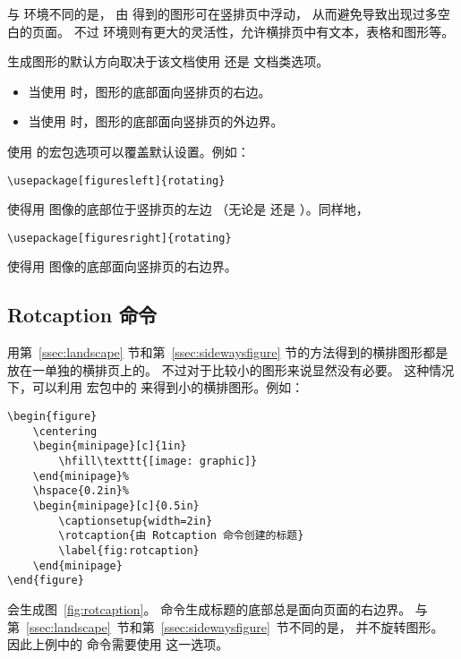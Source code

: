 与  环境不同的是，
由  得到的图形可在竖排页中浮动，
从而避免导致出现过多空白的页面。
不过  环境则有更大的灵活性，允许横排页中有文本，表格和图形等。

 生成图形的默认方向取决于该文档使用  还是  文档类选项。
\begin{itemize}
	\item 当使用  时，图形的底部面向竖排页的右边。
	\item 当使用  时，图形的底部面向竖排页的外边界。
\end{itemize}
使用  的宏包选项可以覆盖默认设置。例如：
\begin{lstlisting}
\usepackage[figuresleft]{rotating}
\end{lstlisting}
使得用  图像的底部位于竖排页的左边
（无论是  还是 ）。同样地，
\begin{lstlisting}
\usepackage[figuresright]{rotating}
\end{lstlisting}
使得用  图像的底部面向竖排页的右边界。

\subsection{Rotcaption 命令}

用第~\ref{ssec:landscape} 节和第~\ref{ssec:sidewaysfigure} 节的方法得到的横排图形都是放在一单独的横排页上的。
不过对于比较小的图形来说显然没有必要。
这种情况下，可以利用  宏包中的  来得到小的横排图形。例如：
\begin{lstlisting}
\begin{figure}
	\centering
	\begin{minipage}[c]{1in}
		\hfill\texttt{[image: graphic]}
	\end{minipage}%
	\hspace{0.2in}%
	\begin{minipage}[c]{0.5in}
		\captionsetup{width=2in}
		\rotcaption{由 Rotcaption 命令创建的标题}
		\label{fig:rotcaption}
	\end{minipage}
\end{figure}
\end{lstlisting}
会生成图~\ref{fig:rotcaption}。
 命令生成标题的底部总是面向页面的右边界。
与第~\ref{ssec:landscape}~节和第~\ref{ssec:sidewaysfigure}~节不同的是，
 并不旋转图形。
因此上例中的  命令需要使用  这一选项。

